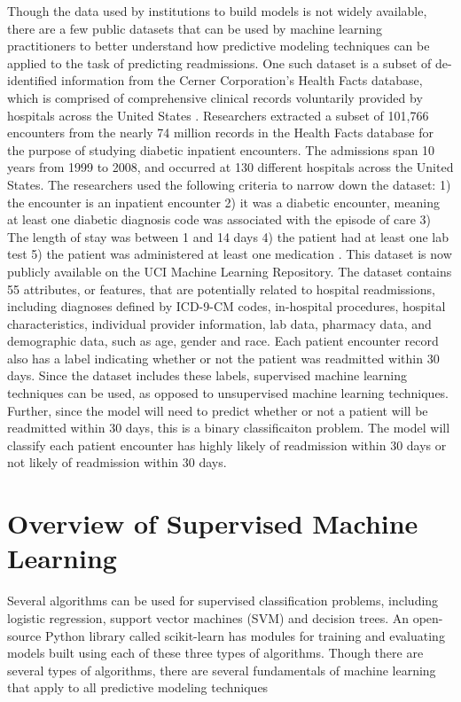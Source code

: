 \documentclass[sigconf]{acmart}
\begin{document}
Though the data used by institutions to build models is not widely available, there are a few public  datasets that can be used by machine learning practitioners to better understand how predictive modeling techniques can be applied to the task of predicting readmissions. One such dataset is a subset of de-identified information from the Cerner Corporation's Health Facts database, which is comprised of comprehensive clinical records voluntarily provided by hospitals across the United States \cite{cite11}.
Researchers extracted a subset of 101,766 encounters from the nearly 74 million records in the Health Facts database for the purpose of studying diabetic inpatient encounters. The admissions span 10 years from 1999 to 2008, and occurred at 130 different hospitals across the United States. The researchers used the following criteria to narrow down the dataset: 1) the encounter is an inpatient encounter 2) it was a diabetic encounter, meaning at least one diabetic diagnosis code was associated with the episode of care 3) The length of stay was between 1 and 14 days 4) the patient had at least one lab test 5) the patient was administered at least one medication \cite{cite11}. This dataset is now publicly available on the UCI Machine Learning Repository.
The dataset contains 55 attributes, or features, that are potentially related to hospital readmissions, including diagnoses defined by ICD-9-CM codes, in-hospital procedures, hospital characteristics, individual provider information, lab data, pharmacy data, and demographic data, such as age, gender and race. Each patient encounter record also has a label indicating whether or not the patient was readmitted within 30 days. Since the dataset includes these labels, supervised machine learning techniques can be used, as opposed to unsupervised machine learning techniques. Further, since the model will need to predict whether or not a patient will be readmitted within 30 days, this is a binary classificaiton problem. The model will classify each patient encounter has highly likely of readmission within 30 days or not likely of readmission within 30 days.

\section{Overview of Supervised Machine Learning}

Several algorithms can be used for supervised classification problems, including logistic regression, support vector machines (SVM) and decision trees. An open-source Python library called scikit-learn has modules for training and evaluating models built using each of these three types of algorithms. Though there are several types of algorithms, there are several fundamentals of machine learning that apply to all predictive modeling techniques
\end{document}
